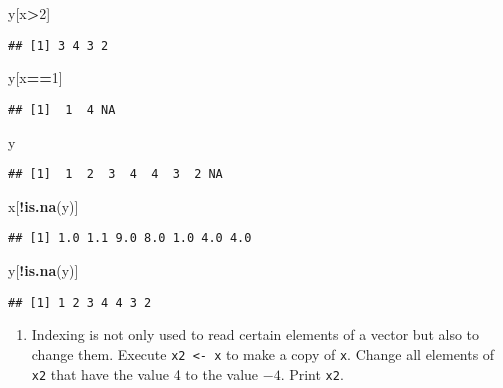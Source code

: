 \documentclass[]{article}
\newenvironment{Shaded}{\begin{snugshade}}{\end{snugshade}}
\newcommand{\KeywordTok}[1]{\textcolor[rgb]{0.13,0.29,0.53}{\textbf{#1}}}
\newcommand{\DecValTok}[1]{\textcolor[rgb]{0.00,0.00,0.81}{#1}}
\newcommand{\OperatorTok}[1]{\textcolor[rgb]{0.81,0.36,0.00}{\textbf{#1}}}
\newcommand{\NormalTok}[1]{#1}
\providecommand{\tightlist}{%
  \setlength{\itemsep}{0pt}\setlength{\parskip}{0pt}}
\begin{document}
\begin{Shaded}
\begin{Highlighting}[]
\NormalTok{y[x}\OperatorTok{>}\DecValTok{2}\NormalTok{]}
\end{Highlighting}
\end{Shaded}

\begin{verbatim}
## [1] 3 4 3 2
\end{verbatim}

\begin{Shaded}
\begin{Highlighting}[]
\NormalTok{y[x}\OperatorTok{==}\DecValTok{1}\NormalTok{]}
\end{Highlighting}
\end{Shaded}

\begin{verbatim}
## [1]  1  4 NA
\end{verbatim}

\begin{Shaded}
\begin{Highlighting}[]
\NormalTok{y}
\end{Highlighting}
\end{Shaded}

\begin{verbatim}
## [1]  1  2  3  4  4  3  2 NA
\end{verbatim}

\begin{Shaded}
\begin{Highlighting}[]
\NormalTok{x[}\OperatorTok{!}\KeywordTok{is.na}\NormalTok{(y)]}
\end{Highlighting}
\end{Shaded}

\begin{verbatim}
## [1] 1.0 1.1 9.0 8.0 1.0 4.0 4.0
\end{verbatim}

\begin{Shaded}
\begin{Highlighting}[]
\NormalTok{y[}\OperatorTok{!}\KeywordTok{is.na}\NormalTok{(y)]}
\end{Highlighting}
\end{Shaded}

\begin{verbatim}
## [1] 1 2 3 4 4 3 2
\end{verbatim}

\begin{enumerate}
\def\labelenumi{\arabic{enumi}.}
\setcounter{enumi}{2}
\tightlist
\item
  Indexing is not only used to read certain elements of a vector but
  also to change them. Execute \texttt{x2\ \textless{}-\ x} to make a
  copy of \texttt{x}. Change all elements of \texttt{x2} that have the
  value 4 to the value \(-4\). Print \texttt{x2}.
\end{enumerate}
\end{document}
